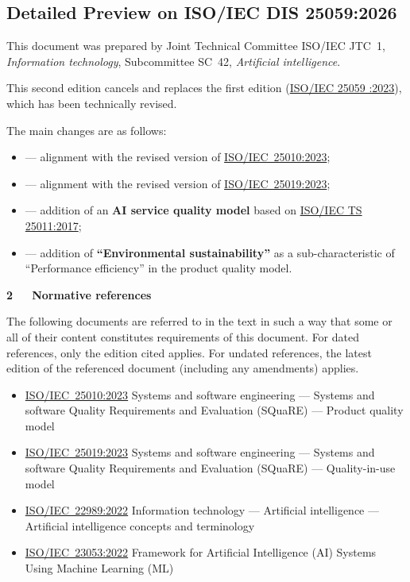 \documentclass[
  letterpaper,
  DIV=11,
  numbers=noendperiod,
  oneside]{scrreprt}
\begin{document}
\begin{tcolorbox}
\chapter{Detailed Preview on ISO/IEC DIS
25059:2026}\label{sec-iso-25059-preview}

This document was prepared by Joint Technical Committee ISO/IEC JTC~1,
\emph{Information technology}, Subcommittee SC~42, \emph{Artificial
intelligence}.

This second edition cancels and replaces the first edition
(\href{https://www.iso.org/obp/ui/\#iso:std:iso-iec:25059:ed-1:v1:en}{ISO/IEC
25059 :2023}), which has been technically revised.

The main changes are as follows:

\begin{itemize}
\item
  --- alignment with the revised version of
  \href{https://www.iso.org/obp/ui/\#iso:std:iso-iec:25010:ed-2:v1:en}{ISO/IEC~25010:2023};
\item
  --- alignment with the revised version of
  \href{https://www.iso.org/obp/ui/\#iso:std:iso-iec:25019:ed-1:v1:en}{ISO/IEC~25019:2023};
\item
  --- addition of an \textbf{AI service quality model} based on
  \href{https://www.iso.org/obp/ui/\#iso:std:iso-iec:ts:25011:ed-1:v2:en}{ISO/IEC
  TS 25011:2017};
\item
  --- addition of \textbf{``Environmental sustainability''} as a
  sub-characteristic of ``Performance efficiency'' in the product
  quality model.
\end{itemize}

\textbf{2~~~Normative references}

The following documents are referred to in the text in such a way that
some or all of their content constitutes requirements of this document.
For dated references, only the edition cited applies. For undated
references, the latest edition of the referenced document (including any
amendments) applies.

\begin{itemize}
\item
  \href{https://www.iso.org/obp/ui/\#iso:std:iso-iec:25010:ed-2:v1:en}{ISO/IEC~25010:2023}
  Systems and software engineering --- Systems and software Quality
  Requirements and Evaluation (SQuaRE) --- Product quality model
\item
  \href{https://www.iso.org/obp/ui/\#iso:std:iso-iec:25019:ed-1:v1:en}{ISO/IEC~25019:2023}
  Systems and software engineering --- Systems and software Quality
  Requirements and Evaluation (SQuaRE) --- Quality-in-use model
\item
  \href{https://www.iso.org/obp/ui/\#iso:std:iso-iec:22989:ed-1:v1:en}{ISO/IEC~22989:2022}
  Information technology --- Artificial intelligence --- Artificial
  intelligence concepts and terminology
\item
  \href{https://www.iso.org/obp/ui/\#iso:std:iso-iec:23053:ed-1:v1:en}{ISO/IEC~23053:2022}
  Framework for Artificial Intelligence (AI) Systems Using Machine
  Learning (ML)
\end{itemize}


\end{tcolorbox}
\end{document}
